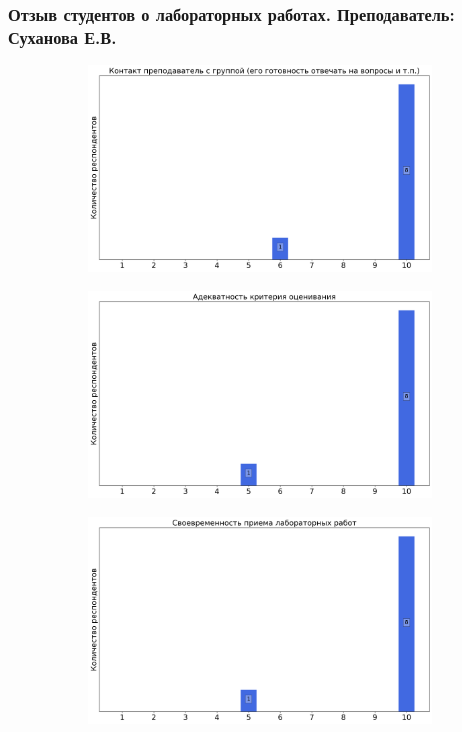     \subsubsection{Отзыв студентов о лабораторных работах. Преподаватель: Суханова Е.В.}
		\begin{figure}[H]
			\centering
			\begin{subfigure}[b]{0.45\textwidth}
				\centering
				\includegraphics[width=\textwidth]{images/1 course/Общая физика - механика/labniks-marks-Суханова Е.В.-0.png}
			\end{subfigure}
			\begin{subfigure}[b]{0.45\textwidth}
				\centering
				\includegraphics[width=\textwidth]{images/1 course/Общая физика - механика/labniks-marks-Суханова Е.В.-1.png}
			\end{subfigure}
			\begin{subfigure}[b]{0.45\textwidth}
				\centering
				\includegraphics[width=\textwidth]{images/1 course/Общая физика - механика/labniks-marks-Суханова Е.В.-2.png}

\end{subfigure}
\end{figure}
